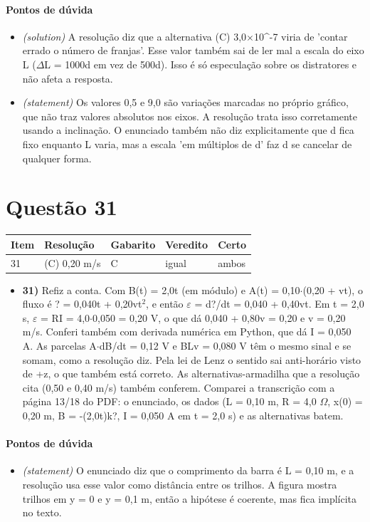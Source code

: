 \documentclass{article}%
\begin{document}
\paragraph{Pontos de dúvida}%
\begin{itemize}%
\item%
\textit{(solution)} A resolução diz que a alternativa (C) 3,0$\times$10\^{}{-}7 viria de 'contar errado o número de franjas'. Esse valor também sai de ler mal a escala do eixo L ($\Delta$L = 1000d em vez de 500d). Isso é só especulação sobre os distratores e não afeta a resposta.%
\item%
\textit{(statement)} Os valores 0,5 e 9,0 são variações marcadas no próprio gráfico, que não traz valores absolutos nos eixos. A resolução trata isso corretamente usando a inclinação. O enunciado também não diz explicitamente que d fica fixo enquanto L varia, mas a escala 'em múltiplos de d' faz d se cancelar de qualquer forma.%
\end{itemize}%
\section*{Questão 31}%
\begin{longtable}{@{}p{} p{} p{} p{} p{}@{}}\toprule Item & Resolução & Gabarito & Veredito & Certo \\ \midrule
31 & (C) 0,20 m/s & C & igual & ambos \\
\bottomrule\end{longtable}%
\begin{itemize}%
\item%
\textbf{31)} Refiz a conta. Com B(t) = 2,0t (em módulo) e A(t) = 0,10$\cdot$(0,20 + vt), o fluxo é ? = 0,040t + 0,20vt$^2$, e então $\varepsilon$ = d?/dt = 0,040 + 0,40vt. Em t = 2,0 s, $\varepsilon$ = RI = 4,0$\cdot$0,050 = 0,20 V, o que dá 0,040 + 0,80v = 0,20 e v = 0,20 m/s. Conferi também com derivada numérica em Python, que dá I = 0,050 A. As parcelas A$\cdot$dB/dt = 0,12 V e BLv = 0,080 V têm o mesmo sinal e se somam, como a resolução diz. Pela lei de Lenz o sentido sai anti{-}horário visto de +z, o que também está correto. As alternativas{-}armadilha que a resolução cita (0,50 e 0,40 m/s) também conferem. Comparei a transcrição com a página 13/18 do PDF: o enunciado, os dados (L = 0,10 m, R = 4,0 $\Omega$, x(0) = 0,20 m, B = -(2,0t)k?, I = 0,050 A em t = 2,0 s) e as alternativas batem.%
\end{itemize}%
\paragraph{Pontos de dúvida}%
\begin{itemize}%
\item%
\textit{(statement)} O enunciado diz que o comprimento da barra é L = 0,10 m, e a resolução usa esse valor como distância entre os trilhos. A figura mostra trilhos em y = 0 e y = 0,1 m, então a hipótese é coerente, mas fica implícita no texto.%
\end{itemize}%
\end{document}
